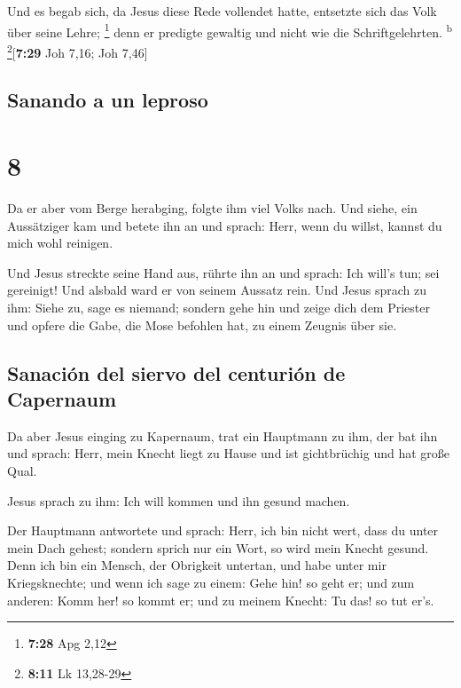  Und es begab sich, da Jesus diese Rede vollendet hatte,
entsetzte sich das Volk über seine Lehre; \footnote{\textbf{7:28} Apg
  2,12}  denn er predigte gewaltig und nicht wie die
Schriftgelehrten. \textsuperscript{b} \footnote{\textbf{8:11} Lk
  13,28-29}{[}\textbf{7:29} Joh 7,16; Joh 7,46{]}

\hypertarget{sanando-a-un-leproso}{%
\subsection{Sanando a un leproso}\label{sanando-a-un-leproso}}

\hypertarget{section-7}{%
\section{8}\label{section-7}}

 Da er aber vom Berge herabging, folgte ihm viel Volks
nach.  Und siehe, ein Aussätziger kam und betete ihn an
und sprach: Herr, wenn du willst, kannst du mich wohl reinigen.

 Und Jesus streckte seine Hand aus, rührte ihn an und
sprach: Ich will's tun; sei gereinigt! Und alsbald ward er von seinem
Aussatz rein.  Und Jesus sprach zu ihm: Siehe zu, sage es
niemand; sondern gehe hin und zeige dich dem Priester und opfere die
Gabe, die Mose befohlen hat, zu einem Zeugnis über sie.

\hypertarget{sanaciuxf3n-del-siervo-del-centuriuxf3n-de-capernaum}{%
\subsection{Sanación del siervo del centurión de
Capernaum}\label{sanaciuxf3n-del-siervo-del-centuriuxf3n-de-capernaum}}

 Da aber Jesus einging zu Kapernaum, trat ein Hauptmann zu
ihm, der bat ihn  und sprach: Herr, mein Knecht liegt zu
Hause und ist gichtbrüchig und hat große Qual.

 Jesus sprach zu ihm: Ich will kommen und ihn gesund
machen.

 Der Hauptmann antwortete und sprach: Herr, ich bin nicht
wert, dass du unter mein Dach gehest; sondern sprich nur ein Wort, so
wird mein Knecht gesund.  Denn ich bin ein Mensch, der
Obrigkeit untertan, und habe unter mir Kriegsknechte; und wenn ich sage
zu einem: Gehe hin! so geht er; und zum anderen: Komm her! so kommt er;
und zu meinem Knecht: Tu das! so tut er's.

